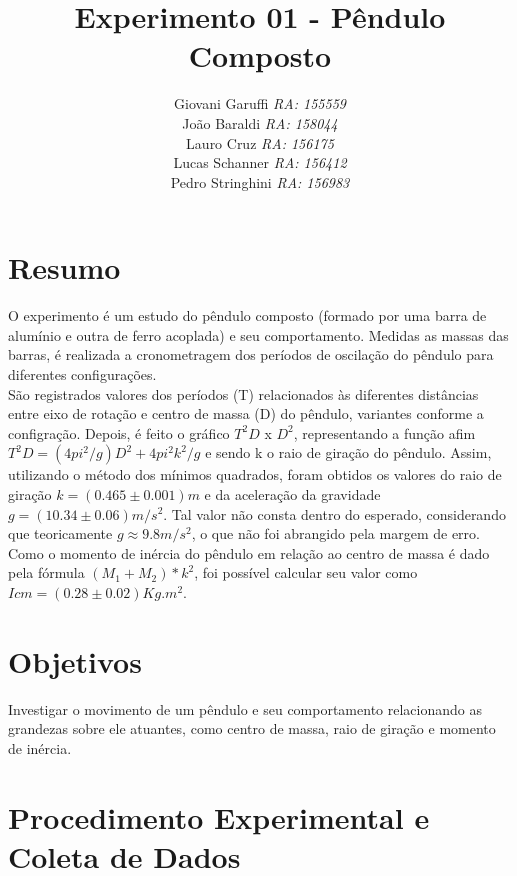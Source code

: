 \documentclass[12pt,a4paper]{article}
\begin{document}
\title{\vspace{70mm}\Huge Experimento 01 - Pêndulo Composto}
\author{ Giovani Garuffi\qquad\hfill
		\textit {RA: 155559}\protect\\
		João Baraldi\hfill
		\textit{RA: 158044}\protect\\
		Lauro Cruz\hfill
		\textit{RA: 156175}\protect\\
		Lucas Schanner\hfill
		\textit{RA: 156412}\protect\\
		Pedro Stringhini\hfill
		\textit {RA: 156983}								
		}
\maketitle
\newpage
\section{Resumo}

O experimento é um estudo do pêndulo composto (formado por uma barra de alumínio e outra de ferro acoplada) e seu comportamento. Medidas as massas das barras, é realizada a cronometragem dos períodos de oscilação do pêndulo para diferentes configurações.\\ %
São registrados valores dos períodos (T) relacionados às diferentes distâncias entre eixo de rotação e centro de massa (D) do pêndulo, variantes conforme a configração. Depois, é feito o gráfico $T^2D$ x $D^2$, representando a função afim $T^2D = (4pi^2/g)D^2 + 4pi^2k^2/g$ e sendo k o raio de giração do pêndulo. Assim, utilizando o método dos mínimos quadrados, foram obtidos os valores do raio de giração $k = (0.465 \pm 0.001)m$ e da aceleração da gravidade $g = (10.34 \pm 0.06) m/s^2$. Tal valor não consta dentro do esperado, considerando que  teoricamente $g\approx9.8 m/s^2$, o que não foi abrangido pela margem de erro. Como o momento de inércia do pêndulo em relação ao centro de massa é dado pela fórmula $(M_1 + M_2)*k^2$, foi possível calcular seu valor como $Icm = (0.28 \pm 0.02)Kg.m^2$.
\section{Objetivos}
Investigar o movimento de um pêndulo e seu comportamento relacionando as grandezas sobre ele atuantes, como centro de massa, raio de giração e momento de inércia.

\section{Procedimento Experimental e Coleta de Dados}
\end{document}
